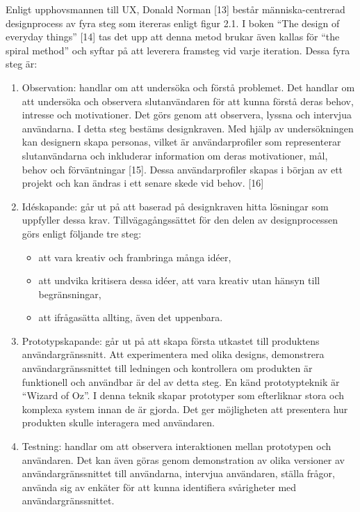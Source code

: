 \documentclass{kththesis}
\begin{document}
Enligt upphovsmannen till UX, Donald Norman [13] består människa-centrerad designprocess av fyra steg som itereras enligt figur 2.1. I boken “The design of everyday things” [14] tas det upp att denna metod brukar även kallas för “the spiral method” och syftar på att leverera framsteg vid varje iteration. Dessa fyra steg är: 

\begin{enumerate}
\item Observation: handlar om att undersöka och förstå problemet. Det handlar om att undersöka och observera slutanvändaren för att kunna förstå deras behov, intresse och motivationer. Det görs genom att observera, lyssna och intervjua användarna. I detta steg bestäms designkraven. Med hjälp av undersökningen kan designern skapa personas, vilket är användarprofiler som representerar slutanvändarna och inkluderar information om deras motivationer, mål, behov och förväntningar [15]. Dessa användarprofiler skapas i början av ett projekt och kan ändras i ett senare skede vid behov. [16]

\item Idéskapande: går ut på att baserad på designkraven hitta lösningar som uppfyller dessa krav. Tillvägagångssättet för den delen av designprocessen görs enligt följande tre steg:
\begin{itemize}
\item att vara kreativ och frambringa många idéer,
\item att undvika kritisera dessa idéer, att vara kreativ utan hänsyn till begränsningar,
\item att ifrågasätta allting, även det uppenbara. 
\end{itemize}

\item Prototypskapande: går ut på att skapa första utkastet till produktens användargränssnitt. Att experimentera med olika designs, demonstrera användargränssnittet till ledningen och kontrollera om produkten är funktionell och användbar är del av detta steg. En känd prototypteknik är “Wizard of Oz”. I denna teknik skapar prototyper som efterliknar stora och komplexa system innan de är gjorda. Det ger möjligheten att presentera hur produkten skulle interagera med användaren. 

\item Testning: handlar om att observera interaktionen mellan prototypen och användaren. Det kan även göras genom demonstration av olika versioner av användargränssnittet till användarna, intervjua användaren, ställa frågor, använda sig av enkäter för att kunna identifiera svårigheter med användargränssnittet.
 
\end{enumerate}
\end{document}
